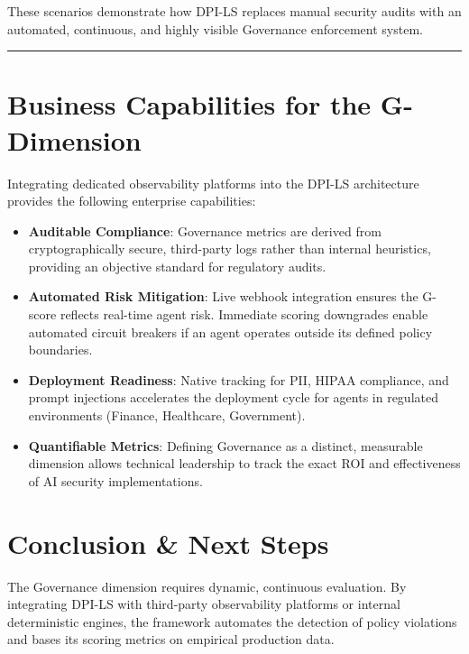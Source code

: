 \documentclass[11pt,a4paper]{article}
\begin{document}
\begin{dpinote}
These scenarios demonstrate how DPI-LS replaces manual security audits with an automated, continuous, and highly visible Governance enforcement system.
\end{dpinote}

\vspace{0.5cm}
\hrule
\vspace{0.5cm}

\section{Business Capabilities for the G-Dimension}

Integrating dedicated observability platforms into the DPI-LS architecture provides the following enterprise capabilities:

\begin{itemize}
    \item \textbf{Auditable Compliance}: Governance metrics are derived from cryptographically secure, third-party logs rather than internal heuristics, providing an objective standard for regulatory audits.
    \item \textbf{Automated Risk Mitigation}: Live webhook integration ensures the G-score reflects real-time agent risk. Immediate scoring downgrades enable automated circuit breakers if an agent operates outside its defined policy boundaries.
    \item \textbf{Deployment Readiness}: Native tracking for PII, HIPAA compliance, and prompt injections accelerates the deployment cycle for agents in regulated environments (Finance, Healthcare, Government).
    \item \textbf{Quantifiable Metrics}: Defining Governance as a distinct, measurable dimension allows technical leadership to track the exact ROI and effectiveness of AI security implementations.
\end{itemize}

\section{Conclusion \& Next Steps}

\begin{dpiimportant}
The Governance dimension requires dynamic, continuous evaluation. By integrating DPI-LS with third-party observability platforms or internal deterministic engines, the framework automates the detection of policy violations and bases its scoring metrics on empirical production data.
\end{dpiimportant}
\end{document}
